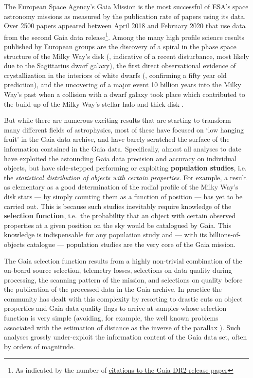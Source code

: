 The European Space Agency's Gaia Mission \cite{2016A&A...595A...1G} is the most successful of ESA's space astronomy missions as measured by the publication rate of papers using its data. Over 2500 papers appeared between April 2018 and February 2020 that use data from the second Gaia data release\footnote{As indicated by the number of  \href{https://ui.adsabs.harvard.edu/search/q=citations(bibcode\%3A2018A\%26A...616A...1G)&sort=date\%20desc\%2C\%20bibcode\%20desc&p_=0}{citations to the Gaia DR2 release paper}}. Among the many high profile science results published by European groups are the discovery of a spiral in the phase space structure of the Milky Way's disk (\cite{2018Natur.561..360A}, indicative of a recent disturbance, most likely due to the Sagittarius dwarf galaxy), the first direct observational evidence of crystallization in the interiors of white dwarfs (\cite{2019Natur.565..202T}, confirming a fifty year old prediction), and the uncovering of a major event 10 billion years into the Milky Way's past when a collision with a dwarf galaxy took place which contributed to the build-up of the Milky Way's stellar halo and thick disk \cite{2018Natur.563...85H, 2018MNRAS.478..611B, 2019arXiv190904679B}. 

But while there are numerous exciting results that are starting to transform many different fields of astrophysics, most of these have focused on `low hanging fruit' in the Gaia data archive, and have barely scratched the surface of the information contained in the Gaia data. Specifically, almost all analyses to date have exploited the astounding Gaia data precision and accuracy on individual objects, but have side-stepped performing or exploiting \textbf{population studies}, i.e. the \textsl{statistical distribution of objects with certain properties}. For example, a result as elementary as a good determination of the radial profile of the Milky Way's disk stars --- by simply counting them as a function of position --- has yet to be carried out. This is because such studies inevitably require knowledge of the \textbf{selection function}, i.e.\ the probability that an object with certain observed properties at a given position on the sky would be catalogued by Gaia. This knowledge is indispensable for any population study and --- with its billions-of-objects catalogue --- population studies are the very core of the Gaia mission.

The Gaia selection function results from a highly non-trivial combination of the on-board source selection, telemetry losses, selections on data quality during processing, the scanning pattern of the mission, and selections on quality before the publication of the processed data in the Gaia archive. In practice the community has dealt with this complexity by resorting to drastic cuts on object properties and Gaia data quality flags to arrive at samples whose selection function is very simple (avoiding, for example, the well known problems associated with the estimation of distance as the inverse of the parallax \cite{2018A&A...616A...9L}). Such analyses grossly under-exploit the information content of the Gaia data set, often by orders of magnitude.

